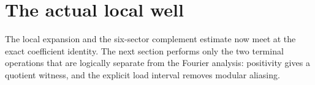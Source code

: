 \section{The actual local well}

The local expansion and the six-sector complement estimate now meet at the exact coefficient identity.  The next section performs only the two terminal operations that are logically separate from the Fourier analysis: positivity gives a quotient witness, and the explicit load interval removes modular aliasing.
